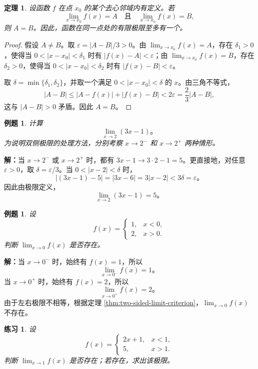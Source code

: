 \documentclass[UTF8,fontset=fandol,11pt]{ctexart}
\newtheorem{theorem}[definition]{定理}
\newtheorem{example}[definition]{例题}
\newtheorem{exercise}[definition]{练习}
\begin{document}
\begin{theorem}
设函数 $f$ 在点 $x_0$ 的某个去心邻域内有定义。若
\[
\lim_{x\to x_0}f(x)=A
\quad\text{且}\quad
\lim_{x\to x_0}f(x)=B,
\]
则 $A=B$。因此，函数在同一点处的有限极限至多有一个。\label{thm:limit-uniqueness}
\end{theorem}
\begin{proof}
假设 $A\ne B$。取 $\varepsilon=|A-B|/3>0$。由 $\lim_{x\to x_0}f(x)=A$，存在 $\delta_1>0$，使得当 $0<|x-x_0|<\delta_1$ 时有 $|f(x)-A|<\varepsilon$；由 $\lim_{x\to x_0}f(x)=B$，存在 $\delta_2>0$，使得当 $0<|x-x_0|<\delta_2$ 时有 $|f(x)-B|<\varepsilon$。

取 $\delta=\min\{\delta_1,\delta_2\}$，并取一个满足 $0<|x-x_0|<\delta$ 的 $x$。由三角不等式，
\[
|A-B|\leq |A-f(x)|+|f(x)-B|<2\varepsilon=\frac{2}{3}|A-B|,
\]
这与 $|A-B|>0$ 矛盾。因此 $A=B$。
\end{proof}
\begin{example}
计算
\[
\lim_{x\to2}(3x-1)。
\]
为说明双侧极限的处理方法，分别考察 $x\to2^-$ 和 $x\to2^+$ 两种情形。
\end{example}
\par\noindent\textbf{解：}当 $x\to2^-$ 或 $x\to2^+$ 时，都有 $3x-1\to3\cdot2-1=5$。更直接地，对任意 $\varepsilon>0$，取 $\delta=\varepsilon/3$。当 $0<|x-2|<\delta$ 时，
\[
|(3x-1)-5|=|3x-6|=3|x-2|<3\delta=\varepsilon。
\]
因此由极限定义，
\[
\lim_{x\to2}(3x-1)=5。
\]\par
\begin{example}
设
\[
f(x)=
\begin{cases}
1,&x<0,\\
2,&x>0.
\end{cases}
\]
判断 $\lim_{x\to0}f(x)$ 是否存在。
\end{example}
\par\noindent\textbf{解：}当 $x\to0^-$ 时，始终有 $f(x)=1$，所以
\[
\lim_{x\to0^-}f(x)=1。
\]
当 $x\to0^+$ 时，始终有 $f(x)=2$，所以
\[
\lim_{x\to0^+}f(x)=2。
\]
由于左右极限不相等，根据定理 \ref{thm:two-sided-limit-criterion}，$\lim_{x\to0}f(x)$ 不存在。\par
\begin{exercise}
\label{mathagent:exercise:bf60311c135cf0c14f3cb42069a931ed175758be7d89dff861bed83a8d332803}
设
\[
f(x)=
\begin{cases}
2x+1,&x<1,\\
5,&x>1.
\end{cases}
\]
判断 $\lim_{x\to1}f(x)$ 是否存在；若存在，求出该极限。
\end{exercise}
\end{document}
